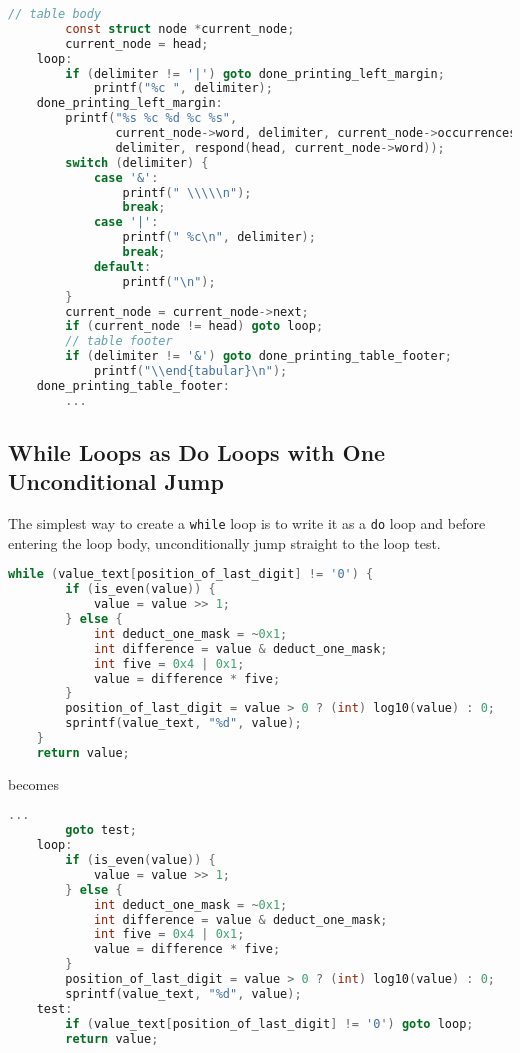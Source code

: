 \documentclass{article}
\begin{document}
\begin{lstlisting}[language=C]
        // table body
        const struct node *current_node;
        current_node = head;
    loop:
        if (delimiter != '|') goto done_printing_left_margin;
            printf("%c ", delimiter);
    done_printing_left_margin:
        printf("%s %c %d %c %s",
               current_node->word, delimiter, current_node->occurrences,
               delimiter, respond(head, current_node->word));
        switch (delimiter) {
            case '&':
                printf(" \\\\\n");
                break;
            case '|':
                printf(" %c\n", delimiter);
                break;
            default:
                printf("\n");
        }
        current_node = current_node->next;
        if (current_node != head) goto loop;
        // table footer
        if (delimiter != '&') goto done_printing_table_footer;
            printf("\\end{tabular}\n");
    done_printing_table_footer:
        ...
\end{lstlisting}

\newpage
\subsection{While Loops as Do Loops with One Unconditional Jump}

The simplest way to create a \lstinline{while} loop is to write it as a \lstinline{do} loop and before entering the loop body, unconditionally jump straight to the loop test.

\begin{lstlisting}[language=C]
    while (value_text[position_of_last_digit] != '0') {
        if (is_even(value)) {
            value = value >> 1;
        } else {
            int deduct_one_mask = ~0x1;
            int difference = value & deduct_one_mask;
            int five = 0x4 | 0x1;
            value = difference * five;
        }
        position_of_last_digit = value > 0 ? (int) log10(value) : 0;
        sprintf(value_text, "%d", value);
    }
    return value;
\end{lstlisting}

becomes

\begin{lstlisting}[language=C]
        ...
        goto test;
    loop:
        if (is_even(value)) {
            value = value >> 1;
        } else {
            int deduct_one_mask = ~0x1;
            int difference = value & deduct_one_mask;
            int five = 0x4 | 0x1;
            value = difference * five;
        }
        position_of_last_digit = value > 0 ? (int) log10(value) : 0;
        sprintf(value_text, "%d", value);
    test:
        if (value_text[position_of_last_digit] != '0') goto loop;
        return value;
\end{lstlisting}
\end{document}
